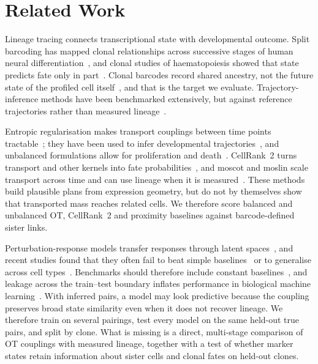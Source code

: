 \documentclass[10pt,journal,compsoc]{IEEEtran}
\begin{document}
\section{Related Work}\label{sec:related}

Lineage tracing connects transcriptional state with developmental outcome. Split barcoding
has mapped clonal relationships across successive stages of human neural
differentiation~\cite{You_2023}, and clonal studies of haematopoiesis showed that state
predicts fate only in part~\cite{Weinreb_2020}. Clonal barcodes record shared ancestry, not
the future state of the profiled cell itself~\cite{Spanjaard_2017}, and that is the target
we evaluate. Trajectory-inference methods have been benchmarked extensively, but against
reference trajectories rather than measured lineage~\cite{Saelens_2019}.

Entropic regularisation makes transport couplings between time points
tractable~\cite{Cuturi_2013}; they have been used to infer developmental
trajectories~\cite{Schiebinger_2019}, and unbalanced formulations allow for proliferation and
death~\cite{Chizat_2018}. CellRank~2 turns transport and other kernels into fate
probabilities~\cite{Weiler_2024}, and moscot and moslin scale transport across time and can
use lineage when it is measured~\cite{Klein_2025,Lange_2024}. These methods build plausible
plans from expression geometry, but do not by themselves show that transported mass reaches
related cells. We therefore score balanced and unbalanced OT, CellRank~2 and proximity
baselines against barcode-defined sister links.

Perturbation-response models transfer responses through latent
spaces~\cite{lotfollahi2018generative}, and recent studies found that they often fail to beat
simple baselines~\cite{mejjad2026scdisentangle} or to generalise across cell
types~\cite{li2026systematic}. Benchmarks should therefore include constant
baselines~\cite{Kanu_TCBB}, and leakage across the train--test boundary inflates performance
in biological machine learning~\cite{rosenblatt2023effects,nieto2026impact}. With inferred
pairs, a model may look predictive because the coupling preserves broad state similarity
even when it does not recover lineage. We therefore train on several pairings, test every
model on the same held-out true pairs, and split by clone. What is missing is a direct,
multi-stage comparison of OT couplings with measured lineage, together with a test of
whether marker states retain information about sister cells and clonal fates on held-out
clones.
\end{document}
